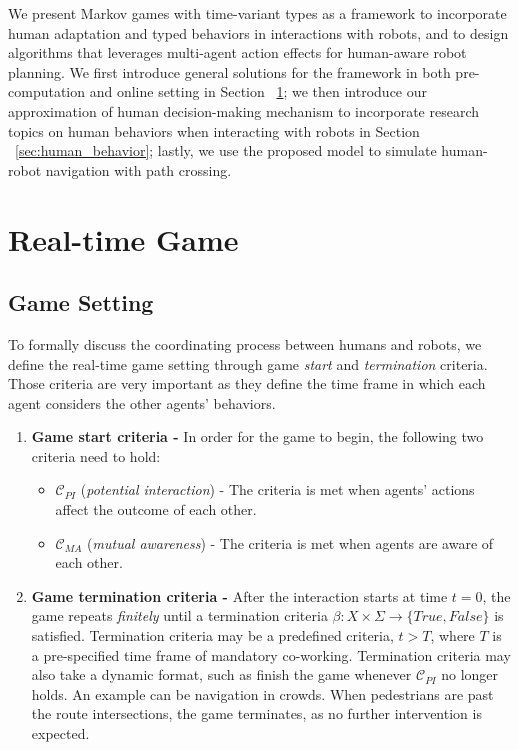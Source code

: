 \documentclass[letterpaper, 10 pt, conference]{ieeeconf}  %
\begin{document}
We present Markov games with time-variant types as a framework to incorporate human adaptation and typed behaviors in interactions with robots, and to design algorithms that leverages multi-agent action effects for human-aware robot planning.   
We first introduce general solutions for the framework in both 
pre-computation and online setting in Section ~\ref{sec:realtime_game}; we 
then introduce our approximation of human decision-making mechanism to 
incorporate research topics on human behaviors when interacting with robots in 
Section ~\ref{sec:human_behavior}; lastly, we use the proposed model to 
simulate human-robot navigation with path crossing.

\vspace{-.3em}
\section{Real-time Game}\label{sec:realtime_game}
\vspace{-.2em}
\subsection{Game Setting}
To formally discuss the coordinating process between humans and robots, we 
define the real-time game setting through game \textit{start} and \textit{termination} criteria. Those criteria are very important as they define the time frame in which each agent considers the other agents' behaviors.

\begin{enumerate}
	\item \textbf{Game start criteria -} In order for the game to begin, the following two 
    criteria need to hold:
	\begin{itemize}
		\item $\mathcal{C}_{PI}$ (\textit{potential interaction}) - The criteria 
      is met when agents' actions affect the outcome of each other.
		\item $\mathcal{C}_{MA}$ (\textit{mutual awareness}) - The criteria is met when agents are aware of each other.
	\end{itemize} 
	\item \textbf{Game termination criteria -} After the interaction starts at time 
    $t=0$, the game repeats \textit{finitely} until a termination criteria 
    $\beta: X \times \Sigma \rightarrow \{True,False\}$ is satisfied. 
    Termination criteria may be a predefined criteria, $t>T$, where $T$ is a 
    pre-specified time frame of mandatory co-working. Termination criteria may 
    also take a dynamic format, such as finish the game whenever 
    $\mathcal{C}_{PI}$ no longer holds. An example can be navigation in 
    crowds. When pedestrians are past the route intersections, the game terminates, as no further intervention is expected.
\end{enumerate}
\end{document}
